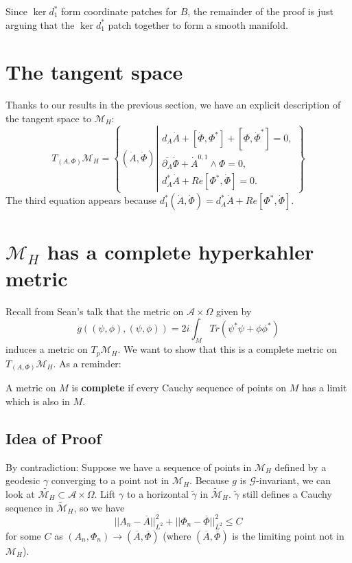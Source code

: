 Since $\ker d_{1}^{*}$ form coordinate patches for $B$, the remainder
of the proof is just arguing that the $\ker d_{1}^{*}$ patch together
to form a smooth manifold.


\section{The tangent space}

Thanks to our results in the previous section, we have an explicit
description of the tangent space to $\mathcal{M}_{H}$:
\[
T_{\left(A,\Phi\right)}\mathcal{M}_{H}=\left\{
\left(\dot{A},\dot{\Phi}\right)\left|\begin{matrix}d_{A}\dot{A}+\left[\dot{\Phi},\Phi^{*}\right]+\left[\Phi,\dot{\Phi}^{*}\right]=0,\\
\overline{\partial_{A}}\dot{\Phi}+\dot{A}^{0,1}\wedge\Phi=0,\\
d_{A}^{*}\dot{A}+Re\left[\Phi^{*},\dot{\Phi}\right]=0.
\end{matrix}\right.\right\}
\]
The third equation appears because $d_{1}^{*}\left(\dot{A},\dot{\Phi}\right)=d_{A}^{*}\dot{A}+Re\left[\Phi^{*},\dot{\Phi}\right]$.


\section{$\mathcal{M}_{H}$ has a complete hyperkahler metric}

Recall from Sean's talk that the metric on $\mathcal{A}\times\Omega$
given by
\[
g\left((\psi,\phi),\left(\psi,\phi\right)\right)=2i\int_{M}Tr\left(\psi^{*}\psi+\phi\phi^{*}\right)
\]
induces a metric on $T_{p}\mathcal{M}_{H}$. We want to show that
this is a complete metric on $T_{\left(A,\Phi\right)}\mathcal{M}_{H}$.
As a reminder:
\begin{defn*}
A metric on $M$ is \textbf{complete} if every Cauchy sequence of
points on $M$ has a limit which is also in $M$.
\end{defn*}

\subsection{Idea of Proof}

By contradiction: Suppose we have a sequence of points in $\mathcal{M}_{H}$
defined by a geodesic $\gamma$ converging to a point not in $\mathcal{M}_{H}$.
Because $g$ is $\mathcal{G}$-invariant, we can look at $\tilde{\mathcal{M}_{H}}\subset\mathcal{A}\times\Omega$.
Lift $\gamma$ to a horizontal $\tilde{\gamma}$ in $\tilde{\mathcal{M}}_{H}$.
$\tilde{\gamma}$ still defines a Cauchy sequence in $\tilde{\mathcal{M}}_{H}$,
so we have
\[
||A_{n}-\overline{A}||_{L^{2}}^{2}+||\Phi_{n}-\overline{\Phi}||_{L^{2}}^{2}\leq C
\]
 for some $C$ as $\left(A_{n},\Phi_{n}\right)\rightarrow\left(\overline{A},\overline{\Phi}\right)$
(where $\left(\overline{A},\overline{\Phi}\right)$ is the limiting
point not in $\mathcal{M}_{H}$).

